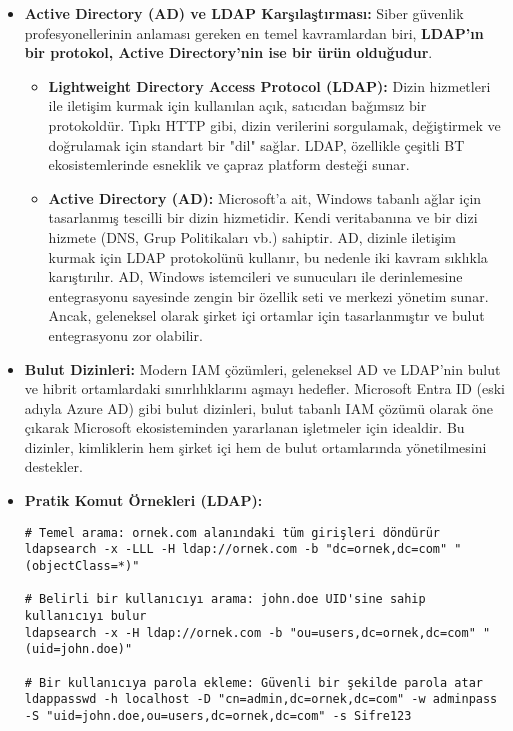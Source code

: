 \begin{itemize}
    \item \textbf{Active Directory (AD) ve LDAP Karşılaştırması:} Siber güvenlik profesyonellerinin anlaması gereken en temel kavramlardan biri, \textbf{LDAP'ın bir protokol, Active Directory'nin ise bir ürün olduğudur}.
    \begin{itemize}
        \item \textbf{Lightweight Directory Access Protocol (LDAP):} Dizin hizmetleri ile iletişim kurmak için kullanılan açık, satıcıdan bağımsız bir protokoldür. Tıpkı HTTP gibi, dizin verilerini sorgulamak, değiştirmek ve doğrulamak için standart bir "dil" sağlar. LDAP, özellikle çeşitli BT ekosistemlerinde esneklik ve çapraz platform desteği sunar.
        \item \textbf{Active Directory (AD):} Microsoft'a ait, Windows tabanlı ağlar için tasarlanmış tescilli bir dizin hizmetidir. Kendi veritabanına ve bir dizi hizmete (DNS, Grup Politikaları vb.) sahiptir. AD, dizinle iletişim kurmak için LDAP protokolünü kullanır, bu nedenle iki kavram sıklıkla karıştırılır. AD, Windows istemcileri ve sunucuları ile derinlemesine entegrasyonu sayesinde zengin bir özellik seti ve merkezi yönetim sunar. Ancak, geleneksel olarak şirket içi ortamlar için tasarlanmıştır ve bulut entegrasyonu zor olabilir.
    \end{itemize}
    \item \textbf{Bulut Dizinleri:} Modern IAM çözümleri, geleneksel AD ve LDAP'nin bulut ve hibrit ortamlardaki sınırlılıklarını aşmayı hedefler. Microsoft Entra ID (eski adıyla Azure AD) gibi bulut dizinleri, bulut tabanlı IAM çözümü olarak öne çıkarak Microsoft ekosisteminden yararlanan işletmeler için idealdir. Bu dizinler, kimliklerin hem şirket içi hem de bulut ortamlarında yönetilmesini destekler.
    
    \item \textbf{Pratik Komut Örnekleri (LDAP):}
\begin{verbatim}
# Temel arama: ornek.com alanındaki tüm girişleri döndürür
ldapsearch -x -LLL -H ldap://ornek.com -b "dc=ornek,dc=com" "(objectClass=*)"

# Belirli bir kullanıcıyı arama: john.doe UID'sine sahip kullanıcıyı bulur
ldapsearch -x -H ldap://ornek.com -b "ou=users,dc=ornek,dc=com" "(uid=john.doe)"

# Bir kullanıcıya parola ekleme: Güvenli bir şekilde parola atar
ldappasswd -h localhost -D "cn=admin,dc=ornek,dc=com" -w adminpass -S "uid=john.doe,ou=users,dc=ornek,dc=com" -s Sifre123
\end{verbatim}
\end{itemize}

